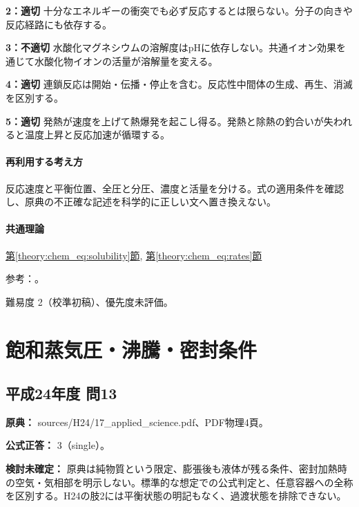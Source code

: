 \noindent\textbf{2：適切} 十分なエネルギーの衝突でも必ず反応するとは限らない。分子の向きや反応経路にも依存する。\par

\noindent\textbf{3：不適切} 水酸化マグネシウムの溶解度はpHに依存しない。共通イオン効果を通じて水酸化物イオンの活量が溶解量を変える。\par

\noindent\textbf{4：適切} 連鎖反応は開始・伝播・停止を含む。反応性中間体の生成、再生、消滅を区別する。\par

\noindent\textbf{5：適切} 発熱が速度を上げて熱爆発を起こし得る。発熱と除熱の釣合いが失われると温度上昇と反応加速が循環する。\par

\paragraph{再利用する考え方} 反応速度と平衡位置、全圧と分圧、濃度と活量を分ける。式の適用条件を確認し、原典の不正確な記述を科学的に正しい文へ置き換えない。

\paragraph{共通理論} \hyperref[theory:chem_eq:solubility]{第\ref*{theory:chem_eq:solubility}節}, \hyperref[theory:chem_eq:rates]{第\ref*{theory:chem_eq:rates}節}

\par 参考：\cite{iupac_greenbook2012}。

\par 難易度 2（校準初稿）、優先度未評価。

\section{飽和蒸気圧・沸騰・密封条件}

\subsection{平成24年度 問13}
\label{q:h24-reg-applied-13}

\noindent\textbf{原典：} sources/H24/17\_applied\_science.pdf、PDF物理4頁。

\textbf{公式正答：} 3（single）。

\par\textbf{検討未確定：} 原典は純物質という限定、膨張後も液体が残る条件、密封加熱時の空気・気相部を明示しない。標準的な想定での公式判定と、任意容器への全称を区別する。H24の肢2には平衡状態の明記もなく、過渡状態を排除できない。

